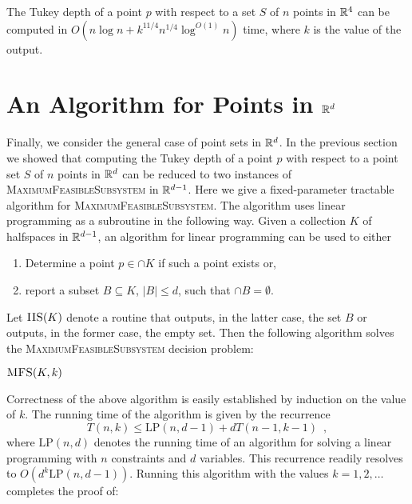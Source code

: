 \documentclass[charterfonts,lotsofwhite]{patmorin}
\newcommand{\lp}{\mathrm{LP}}
\begin{document}
\begin{thm}
The Tukey depth of a point $p$ with respect to a set $S$ of $n$ points
in $\mathbb{R}^4$ can be computed in $O(n\log n + k^{11/4}n^{1/4}\log^{O(1)}
n)$ time, where $k$ is the value of the output.
\end{thm}

\section{An Algorithm for Points in $\mathbb{R}^d$}

Finally, we consider the general case of point sets in $\mathbb{R}^d$.  
In the previous section we showed that computing the Tukey depth of
a point $p$ with respect to a point set $S$ of $n$ points in $\mathbb{R}^d$
can be reduced to two instances of \textsc{MaximumFeasibleSubsystem}
in $\mathbb{R}^{d-1}$.  Here we give a fixed-parameter tractable \cite{dfXX}
algorithm for \textsc{MaximumFeasibleSubsystem}.  The algorithm uses
linear programming as a subroutine in the following way.  Given a
collection $K$ of halfspaces in $\mathbb{R}^{d-1}$, an algorithm for linear
programming can be used to either
\begin{enumerate}
\item Determine a point $p\in\cap K$ if such a point exists or,
\item report a subset $B\subseteq K$, $|B|\le d$, such that $\cap B=\emptyset$.
\end{enumerate}
Let $\textsc{IIS}(K)$ denote a routine that outputs, in the latter
case, the set
$B$ or outputs, in the former case, the empty set.
Then the following algorithm solves the
\textsc{MaximumFeasibleSubsystem} decision problem:

\noindent$\textsc{MFS}(K,k)$
\begin{algorithmic}[1]
\ENDIF
{}
\ENDIF
{}
   \ENDIF
\ENDFOR
{}
\end{algorithmic}

Correctness of the above algorithm is easily established by induction
on the value of $k$.  The running time of the algorithm is given by
the recurrence
\[
    T(n,k) \le \lp(n,d-1)+ dT(n-1,k-1) \enspace ,
\]
where $\lp(n,d)$ denotes the running time of an algorithm for solving
a linear programming with $n$ constraints and $d$ variables.  This
recurrence readily resolves to $O(d^k\lp(n,d-1))$.  Running this
algorithm with the values $k=1,2,\ldots$ completes the
proof of:
\end{document}
